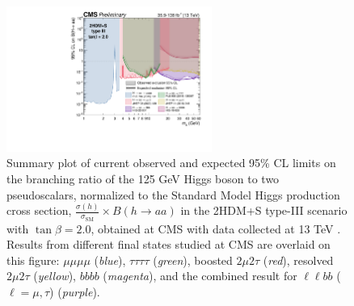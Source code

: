   \begin{figure}[h]
    \begin{center}
      \includegraphics[width=0.6\textwidth]{figures/ch-10-results/summary_plot_full_run2_plot_BRaa_Type3_tanbeta2.pdf}
    \end{center}
    \caption[Summary plot of current observed and expected 95\% CL limits on the branching ratio of the 125 GeV Higgs boson to two pseudoscalars, normalized to the Standard Model Higgs production cross-section, $\frac{\sigma(h)}{\sigma_{\text{SM}}} \times B(h \rightarrow aa)$, in the 2HDM+S type III scenario with $\tan\beta = 2.0$, obtained at CMS with data collected at 13 TeV.]{Summary plot of current observed and expected 95\% CL limits on the branching ratio of the 125 GeV Higgs boson to two pseudoscalars, normalized to the Standard Model Higgs production cross section, $\frac{\sigma(h)}{\sigma_{\text{SM}}} \times B(h \rightarrow aa)$ in the 2HDM+S type-III scenario with $\tan\beta = 2.0$, obtained at CMS with data collected at 13 TeV \cite{twiki_2HDM+S_summary-plots}. Results from different final states studied at CMS are overlaid on this figure: $\mu\mu\mu\mu$ (\textit{blue}), $\tau\tau\tau\tau$ (\textit{green}), boosted $2\mu 2\tau$ (\textit{red}), resolved $2\mu 2\tau$ (\textit{yellow}), $bbbb$ (\textit{magenta}), and the combined result for $\ell\ell bb$ ($\ell = \mu, \tau$) (\textit{purple}).}
      \label{fig:summary_plot_typeIII_tan_beta_2p0}
  \end{figure}
  
